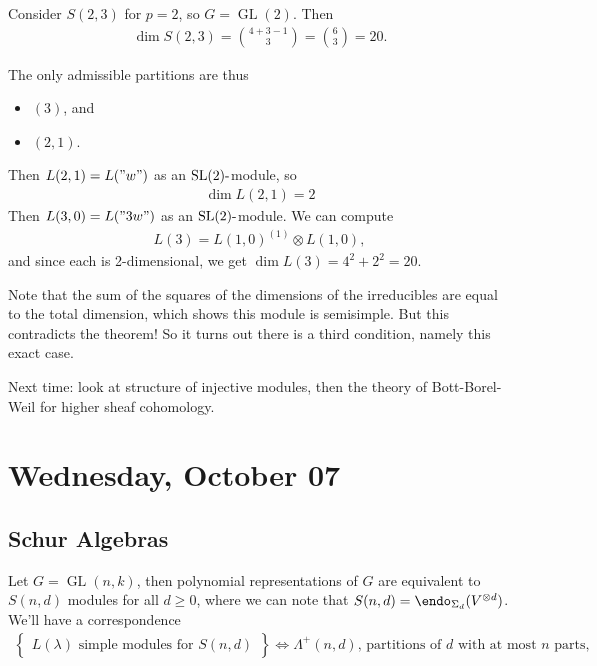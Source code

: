 \begin{example}

Consider \(S(2, 3)\) for \(p=2\), so \(G = \operatorname{GL}(2)\). Then
\begin{align*}  
\dim S(2, 3) = {4+3-1 \choose 3} = {6\choose 3} = 20
.\end{align*}

The only admissible partitions are thus

\begin{itemize}
\tightlist
\item
  \((3)\), and
\item
  \((2, 1)\).
\end{itemize}

Then \(L(2, 1) = L("w")\) as an
\({\operatorname{SL}}(2){\hbox{-}}\)module, so
\begin{align*}
\dim L(2, 1) = 2
\end{align*}
Then \(L(3, 0) = L("3w")\) as an
\({\operatorname{SL}}(2){\hbox{-}}\)module. We can compute
\begin{align*}  
L(3) = L(1, 0)^{(1)} \otimes L(1, 0)
,\end{align*}
and since each is 2-dimensional, we get \(\dim L(3) = 4^2 + 2^2 = 20\).

Note that the sum of the squares of the dimensions of the irreducibles
are equal to the total dimension, which shows this module is semisimple.
But this contradicts the theorem! So it turns out there is a third
condition, namely this exact case.

\end{example}

Next time: look at structure of injective modules, then the theory of
Bott-Borel-Weil for higher sheaf cohomology.

\hypertarget{wednesday-october-07}{%
\section{Wednesday, October 07}\label{wednesday-october-07}}

\hypertarget{schur-algebras}{%
\subsection{Schur Algebras}\label{schur-algebras}}

Let \(G = \operatorname{GL}(n, k)\), then polynomial representations of
\(G\) are equivalent to \(S(n, d)\) modules for all \(d\geq 0\), where
we can note that \(S(n, d) = \endo_{\Sigma_d}(V^{\otimes d})\). We'll
have a correspondence
\begin{align*}  
\left\{{\substack{L(\lambda) \text{ simple modules for } S(n,d)}}\right\}
\iff
\Lambda^+(n, d) \text{, partitions of $d$ with at most $n$ parts}
,\end{align*}

